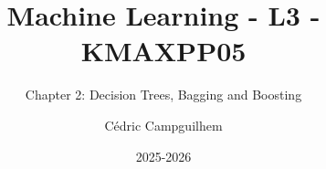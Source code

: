 \documentclass[10pt,handout]{beamer}  %
\title{Machine Learning - L3 - KMAXPP05}
\subtitle{Chapter 2: Decision Trees, Bagging and Boosting}
\author{Cédric Campguilhem}
\institute[]{
	Airbus Operations \\
	\href{mailto:cedric.campguilhem@airbus.com}{\texttt{cedric.campguilhem@airbus.com}}
}
\date{2025-2026}
\begin{document}
	
	\begin{frame}
		\titlepage
	\end{frame}
	
	
	
	
	
	
	
	
\end{document}
